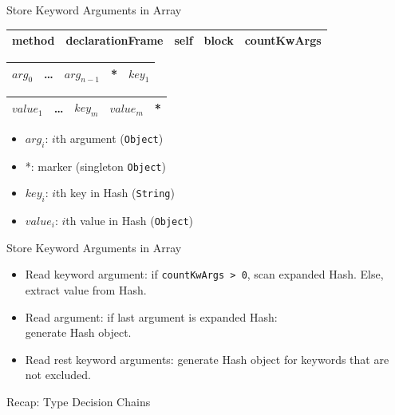 \documentclass[xcolor=dvipsname,handout]{beamer} %
\begin{document}
\begin{frame}{Store Keyword Arguments in Array}
\begin{table}
\begin{tabular}{|c|c|c|c|c|}
\hline
method & declarationFrame & self & block & countKwArgs  \\ 
\hline
\end{tabular}
\end{table}
\begin{table}
\begin{tabular}{|c|c|c|c|c|}
\hline
 $\mathit{arg}_0$ & \ldots & $\mathit{arg}_{n-1}$ & *  & $\mathit{key}_1$\\
\hline
\end{tabular}
\end{table}

\begin{table}
\begin{tabular}{|c|c|c|c|c|}
\hline
 $\mathit{value}_1$ & \ldots  & $\mathit{key}_m$ & $\mathit{value}_m$ & * \\
\hline
\end{tabular}
\end{table}

\begin{itemize}
    \item $\mathit{arg}_i$: $i$th argument (\lstinline{Object})
    \item *: marker (singleton \lstinline{Object})
    \item $\mathit{key}_i$: $i$th key in Hash (\lstinline{String})
    \item $\mathit{value}_i$: $i$th value in Hash (\lstinline{Object})
\end{itemize}
\end{frame}

\begin{frame}{Store Keyword Arguments in Array}
\begin{itemize}
    \item Read keyword argument: if \lstinline{countKwArgs > 0}, scan expanded Hash. Else, extract value from Hash.
    \item Read argument: if last argument is expanded Hash: \\ generate Hash object.
    \item Read rest keyword arguments: generate Hash object for keywords that are not excluded.
\end{itemize}
\end{frame}

\begin{frame}{Recap: Type Decision Chains}

\end{frame}
\end{document}
